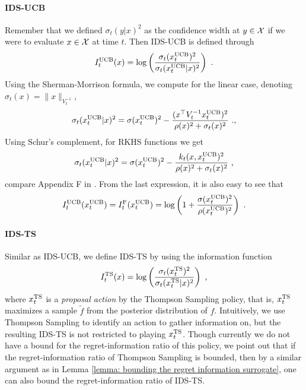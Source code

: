 \paragraph{IDS-UCB}Remember that we defined $\sigma_t(y|x)^2$ as the confidence width at $y \in \mathcal{X}$ if we were to evaluate $x\in \mathcal{X}$ at time $t$. Then IDS-UCB is defined through
\begin{align*}
I_t^{\text{UCB}}(x) = \log\left(\frac{\sigma_t(x_t^{\text{UCB}})^2}{\sigma_t(x_t^{\text{UCB}}|x)^2}\right) \text{ .}
\end{align*} 
Using the Sherman-Morrison formula, we compute for the linear case, denoting $\sigma_t(x) = \|x\|_{V_t^{-1}}$,
\begin{align*}
\sigma_t(x_t^{\text{UCB}}|x)^2 = \sigma(x_t^{\text{UCB}})^2 - \frac{(x^\top V_t^{-1}x_t^{\text{UCB}})^2}{\rho(x)^2 + \sigma_t(x)^2} \text{ .,}
\end{align*}
Using Schur's complement, for RKHS functions we get 
\begin{align*}
\sigma_t(x_t^{\text{UCB}}|x)^2 = \sigma(x_t^{\text{UCB}})^2 - \frac{k_t(x,x_t^{\text{UCB}})^2}{\rho(x)^2 + \sigma_t(x)^2} \text{ ,}
\end{align*}
compare Appendix F in \citep{ChaudhuriActiveHeteroscedasticRegression2017}. From the last expression, it is also easy to see that
\begin{align*}
I_t^{\text{UCB}}(x_t^{\text{UCB}})= I_t^{\text{F}}(x_t^{\text{UCB}}) =  \log\left(1 + \frac{\sigma(x_t^{\text{UCB}})^2}{\rho(x_t^{\text{UCB}})^2}\right)\text{ .} 
\end{align*}
\paragraph{IDS-TS}
Similar as IDS-UCB, we define IDS-TS by using the information function
\begin{align*}
I_t^{\text{TS}}(x) = \log\left(\frac{\sigma_t(x_t^{\text{TS}})^2}{\sigma_t(x_t^{\text{TS}}|x)^2}\right) \text{ ,}
\end{align*} 
where $x_t^{\text{TS}}$ is a \emph{proposal action} by the Thompson Sampling policy, that is, $x_t^{\text{TS}}$ maximizes a sample $\tilde{f}$ from the posterior distribution of $f$. Intuitively, we use Thompson Sampling to identify an action to gather information on, but the resulting IDS-TS is not restricted to playing $x_t^{\text{TS}}$. Though currently we do not have a bound for the regret-information ratio of this policy, we point out that if the regret-information ratio of Thompson Sampling is bounded, then by a similar argument as in Lemma \ref{lemma: bounding the regret information surrogate}, one can also bound the regret-information ratio of IDS-TS.

